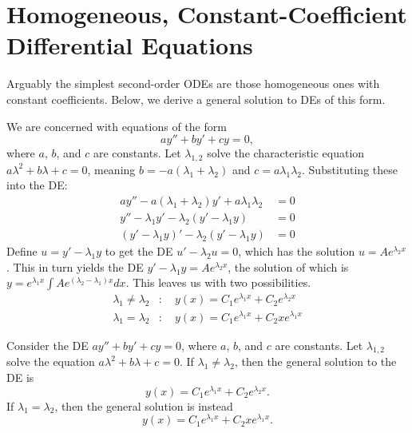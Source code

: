\documentclass[../m82main.tex]{subfiles}
\begin{document}
\section{Homogeneous, Constant-Coefficient Differential Equations}
Arguably the simplest second-order ODEs are those homogeneous ones with constant coefficients.
Below, we derive a general solution to DEs of this form.

\begin{example}
    We are concerned with equations of the form
    \[ ay'' + by' + cy = 0, \]
    where $a$, $b$, and $c$ are constants.
    Let $\lambda_{1,2}$ solve the characteristic equation $a \lambda^2 + b \lambda + c = 0$, meaning $b = -a(\lambda_1 + \lambda_2)$ and $c = a \lambda_1 \lambda_2$.
    Substituting these into the DE:
    \begin{align*}
        ay'' - a(\lambda_1 + \lambda_2)y' + a \lambda_1 \lambda_2 &= 0 \\
        y'' - \lambda_1 y' - \lambda_2 (y' - \lambda_1 y) &= 0 \\
        (y' - \lambda_1 y)' - \lambda_2 (y' - \lambda_1 y) &= 0
    \end{align*}
    Define $u = y' - \lambda_1 y$ to get the DE $u' - \lambda_2 u = 0$, which has the solution $u = Ae^{\lambda_2 x}$.
    This in turn yields the DE $y' - \lambda_1 y = Ae^{\lambda_2 x}$, the solution of which is $\displaystyle y = e^{\lambda_1 x} \int Ae^{(\lambda_2 - \lambda_1)x} dx$.
    This leaves us with two possibilities.
    \begin{align*}
        \lambda_1 \neq \lambda_2&:\quad y(x) = C_1 e^{\lambda_1 x} + C_2 e^{\lambda_2 x} \\
        \lambda_1 = \lambda_2&:\quad y(x) = C_1e^{\lambda_1 x} + C_2 x e^{\lambda_1 x}
    \end{align*}
\end{example}

\begin{theorem}
    Consider the DE $ay'' + by' + cy = 0$, where $a$, $b$, and $c$ are constants.
    Let $\lambda_{1,2}$ solve the equation $a\lambda^2 + b\lambda + c = 0$.
    If $\lambda_1 \neq \lambda_2$, then the general solution to the DE is
    \[ y(x) = C_1 e^{\lambda_1 x} + C_2 e^{\lambda_2 x}. \]
    If $\lambda_1 = \lambda_2$, then the general solution is instead
    \[ y(x) = C_1 e^{\lambda_1 x} + C_2 x e^{\lambda_1 x}. \]
\end{theorem}
\end{document}
